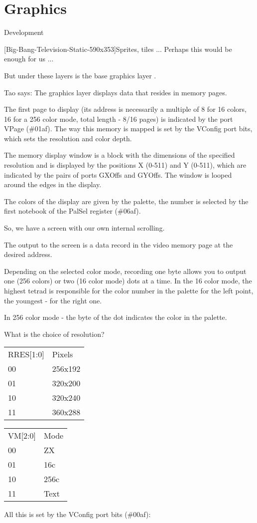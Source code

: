 \chapter{Graphics}
Development

[Big-Bang-Television-Static-590x353]Sprites, tiles ... Perhaps this
would be enough for us ...

But under these layers is the base graphics layer .

Tao says: The graphics layer displays data that resides in memory
pages.

The first page to display (its address is necessarily a multiple of 8
for 16 colors, 16 for a 256 color mode, total length - 8/16 pages) is
indicated by the port VPage (\#01af). The way this memory is mapped is
set by the VConfig port bits, which sets the resolution and color
depth.

The memory display window is a block with the dimensions of the
specified resolution and is displayed by the positions X (0-511) and Y
(0-511), which are indicated by the pairs of ports GXOffs and
GYOffs. The window is looped around the edges in the display.

The colors of the display are given by the palette, the number is
selected by the first notebook of the PalSel register (\#06af).

So, we have a screen with our own internal scrolling.

The output to the screen is a data record in the video memory page at
the desired address.

Depending on the selected color mode, recording one byte allows you to
output one (256 colors) or two (16 color mode) dots at a time. In the
16 color mode, the highest tetrad is responsible for the color number
in the palette for the left point, the youngest - for the right one.

In 256 color mode - the byte of the dot indicates the color in the
palette.

What is the choice of resolution?
\begin{table}
\begin{tabular}{ll}
RRES[1:0] & Pixels\\
00 & 256x192\\
01 & 320x200\\
10 & 320x240\\
11 & 360x288
\end{tabular}
\end{table}
\begin{table}
\begin{tabular}{ll}
VM[2:0] & Mode\\
00 & ZX\\
01 & 16c\\
10 & 256c\\
11 & Text
\end{tabular}
\end{table}
All this is set by the VConfig port bits (\#00af):

